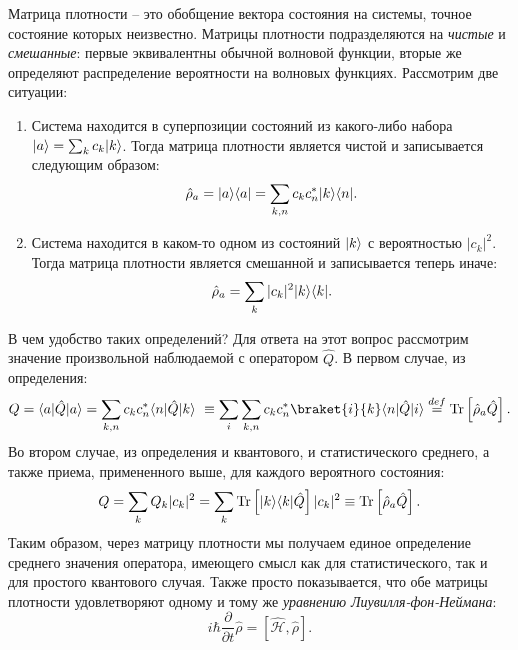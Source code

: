 \documentclass[12pt, twoside]{report}
\newcommand{\Tr}[1]{\text{Tr}\left[#1\right]}
\DeclarePairedDelimiter\bra{\langle}{\rvert}
\DeclarePairedDelimiter\ket{\lvert}{\rangle}
\numberwithin{equation}{section}
\numberwithin{figure}{section}
\begin{document}
Матрица плотности -- это обобщение вектора состояния на системы, точное состояние которых неизвестно. Матрицы плотности подразделяются на \textit{чистые} и \textit{смешанные}: первые эквивалентны обычной волновой функции, вторые же определяют распределение вероятности на волновых функциях. Рассмотрим две ситуации:
\begin{enumerate}
\item Система находится в суперпозиции состояний из какого-либо набора $\ket{a} = \sum_k c_k \ket{k}$. Тогда матрица плотности является чистой и записывается следующим образом: 
\[ \hat \rho_a = \ket{a}\bra{a} = \sum_{k,n}c_k c_n^* \ket{k}\bra{n}.\]
\item Система находится в каком-то одном из состояний $\ket{k}$ с вероятностью $|c_k|^2$. Тогда матрица плотности является смешанной и записывается теперь иначе:
\[ 
\hat \rho_a = \sum_k |c_k|^2 \ket{k}\bra{k}.
\]
\end{enumerate}
В чем удобство таких определений? Для ответа на этот вопрос рассмотрим значение произвольной наблюдаемой с оператором $\hat Q$. В первом случае, из определения:
\[
Q = \bra{a}\hat Q\ket{a} = \sum_{k,n} c_k c_n^* \bra{n}\hat Q\ket{k}\ \equiv \sum_i \sum_{k,n} c_k c_n^* \braket{i}{k} \bra{n} \hat Q \ket{i} \overset{def}{=}\Tr{\hat \rho_a \hat Q}. 
\]
Во втором случае, из определения и квантового, и статистического среднего, а также приема, примененного выше, для каждого вероятного состояния:
\[
Q = \sum_k Q_k |c_k|^2 = \sum_k \Tr{ \ket{k}\bra{k} \hat Q} |c_k|^2 \equiv \Tr{\hat \rho_a \hat Q}. 
\]
Таким образом, через матрицу плотности мы получаем единое определение среднего значения оператора, имеющего смысл как для статистического, так и для простого квантового случая. Также просто показывается, что обе матрицы плотности удовлетворяют одному и тому же \textit{уравнению Лиувилля-фон-Неймана}: 
\[ 
i\hbar \frac{\partial}{\partial t} \hat \rho = [\mathcal{\hat H}, \hat \rho].
\]
\end{document}
